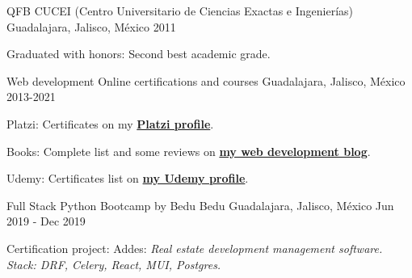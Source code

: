 

\begin{cventries}
  \cventry
    {QFB}
    {CUCEI (Centro Universitario de Ciencias Exactas e Ingenierías)}
    {Guadalajara, Jalisco, México}
    {2011}
    {
      \begin{cvitems}
        \item {Graduated with honors: Second best academic grade.}
      \end{cvitems}
    }

    \cventry
    {Web development}
    {Online certifications and courses}
    {Guadalajara, Jalisco, México}
    {2013-2021}
    {
      \begin{cvitems}
        \item {Platzi: Certificates on my \color{gray} \textbf{\href{https://platzi.com/@eduardo-zepeda/}{Platzi profile}}.}
        \item {Books: Complete list and some reviews on \color{gray} \textbf{ \href{https://eduardozepeda.dev/pages/books-i-read/}{my web development blog}}.}
        \item {Udemy: Certificates list on \color{gray} \textbf{\href{https://www.udemy.com/user/carlos-eduardo-magallon-zepeda/}{my Udemy profile}}.}
      \end{cvitems}
    }

    \cventry
    {Full Stack Python Bootcamp by Bedu}
    {Bedu}
    {Guadalajara, Jalisco, México}
    {Jun 2019 - Dec 2019}
    {
      \begin{cvitems}
        \item {Certification project: Addes: \textit{Real estate development management software. Stack: DRF, Celery, React, MUI, Postgres.}}
      \end{cvitems}
    }
\end{cventries}
